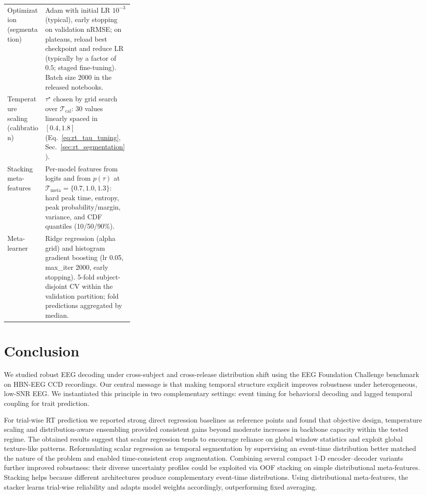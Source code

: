 \documentclass[12pt]{article}
\begin{document}
\begin{table}[t!]
\begin{tabularx}{\linewidth}{@{} p{0.30\linewidth} X @{}}
Optimization (segmentation) &
Adam with initial LR $10^{-3}$ (typical), early stopping on validation nRMSE; on plateaus, reload best checkpoint and
reduce LR (typically by a factor of $0.5$; staged fine-tuning). Batch size 2000 in the released notebooks. \\

Temperature scaling (calibration) &
$\tau^\star$ chosen by grid search over $\mathcal{T}_{\text{cal}}$: 30 values linearly spaced in $[0.4,1.8]$
(Eq.~\ref{eq:rt_tau_tuning}, Sec.~\ref{sec:rt_segmentation}). \\

Stacking meta-features &
Per-model features from logits and from $p(\tau)$ at $\mathcal{T}_{\text{meta}}=\{0.7,1.0,1.3\}$: hard peak time,
entropy, peak probability/margin, variance, and CDF quantiles (10/50/90\%). \\

Meta-learner &
Ridge regression (alpha grid) and histogram gradient boosting (lr 0.05, max\_iter 2000, early stopping).
5-fold subject-disjoint CV within the validation partition; fold predictions aggregated by median. \\
\bottomrule
\end{tabularx}
\end{table}

\section{Conclusion}
We studied robust EEG decoding under cross-subject and cross-release distribution shift using the EEG Foundation Challenge
benchmark on HBN-EEG CCD recordings. Our central message is that making temporal structure explicit improves robustness
under heterogeneous, low-SNR EEG. We instantiated this principle in two complementary settings: event timing for
behavioral decoding and lagged temporal coupling for trait prediction.

For trial-wise RT prediction we reported strong direct regression baselines as reference
points and found that objective design, temperature scaling and distribution-aware ensembling provided
consistent gains beyond moderate increases in backbone capacity within the tested regime. The obtained results suggest that scalar regression tends to encourage reliance on global window statistics and exploit global texture-like patterns.  Reformulating scalar regression as temporal segmentation by supervising an
event-time distribution better matched the nature of
the problem and enabled time-consistent crop augmentation. Combining several compact 1-D encoder–decoder variants further improved robustness: their diverse uncertainty profiles could be exploited via OOF stacking on simple distributional meta-features. Stacking helps because different architectures produce complementary event-time distributions. Using distributional meta-features, the stacker learns trial-wise reliability and adapts model weights accordingly, outperforming fixed averaging.
\end{document}

